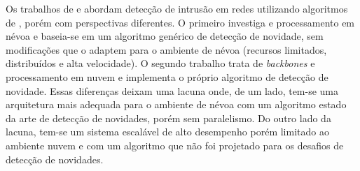 
Os trabalhos de  e  abordam
detecção de intrusão em redes utilizando algoritmos de \nd, porém com
perspectivas diferentes.
O primeiro investiga \iot e processamento em névoa e baseia-se em um algoritmo
genérico de detecção de novidade, sem modificações que o adaptem para o ambiente
de névoa (recursos limitados, distribuídos e alta velocidade).
O segundo trabalho trata de \emph{backbones} e processamento em nuvem e
implementa o próprio algoritmo de detecção de novidade.
Essas diferenças deixam uma lacuna onde, de um lado, tem-se uma
arquitetura mais adequada para o ambiente de névoa com um algoritmo estado da arte de
detecção de novidades, porém sem paralelismo.
Do outro lado da lacuna, tem-se um sistema escalável de alto desempenho porém
limitado ao ambiente nuvem e com um algoritmo que não foi projetado
para os desafios de detecção de novidades.


